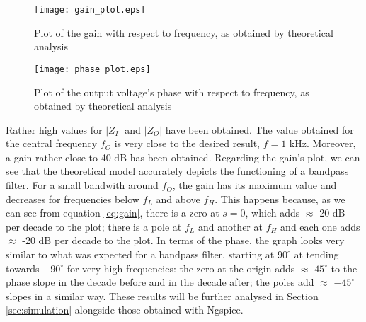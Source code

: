 \begin{figure}[H] \centering
  \texttt{[image: gain\_plot.eps]}
  \caption{Plot of the gain with respect to frequency, as obtained by theoretical analysis}
  \label{fig:gain_plot}
\end{figure}

\begin{figure}[H] \centering
  \texttt{[image: phase\_plot.eps]}
  \caption{Plot of the output voltage's phase with respect to frequency, as obtained by theoretical analysis}
  \label{fig:phase_plot}
\end{figure}

Rather high values for $|Z_I|$ and $|Z_O|$ have been obtained. The value obtained for the central frequency $f_O$ is very close to the desired result, $f=1$ kHz. Moreover, a gain rather close to 40 dB has been obtained. Regarding the gain's plot, we can see that the theoretical model accurately depicts the functioning of a bandpass filter. For a small bandwith around $f_O$, the gain has its maximum value and decreases for frequencies below $f_L$ and above $f_H$. This happens because, as we can see from equation \ref{eq:gain}, there is a zero at $s=0$, which adds $\approx$ 20 dB per decade to the plot; there is a pole at $f_L$ and another at $f_H$ and each one adds $\approx$ -20 dB per decade to the plot. In terms of the phase, the graph looks very similar to what was expected for a bandpass filter, starting at $90^{\circ}$ at tending towards $-90^{\circ}$ for very high frequencies: the zero at the origin adds $\approx$ $45^{\circ}$ to the phase slope in the decade before and in the decade after; the poles add $\approx$ $-45^{\circ}$ slopes in a similar way. These results will be further analysed in Section \ref{sec:simulation} alongside those obtained with Ngspice.
